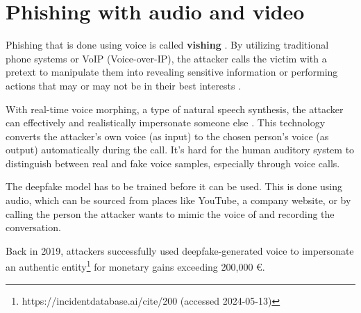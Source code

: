 
\section{Phishing with audio and video}
\begin{comment}
Phishing & spear phishing

What to cover:
    - What is phishing (via email and ALSO other means)
    - Spear phishing a more targeted form of phishing
    - How ChatGPT can be used to improve scam messages
    - ChatGPT:n eettisten ohjeistusten ohittaminen on jo käsitelty kohdassa Chatbots

\end{comment}

Phishing that is done using voice is called \textbf{vishing} \citep{salahdineSocialEngineeringAttacks2019}. By utilizing traditional phone systems or VoIP (Voice-over-IP), the attacker calls the victim with a pretext to manipulate them into revealing sensitive information or performing actions that may or may not be in their best interests \citep{hadnagySocialEngineering2018}.



With real-time voice morphing, a type of natural speech synthesis, the attacker can effectively and realistically impersonate someone else \citep{doanBTSEAudioDeepfakeDetectiong2023}. This technology converts the attacker's own voice (as input) to the chosen person's voice (as output) automatically during the call. It's hard for the human auditory system to distinguish between real and fake voice samples, especially through voice calls.

The deepfake model has to be trained before it can be used. This is done using audio, which can be sourced from places like YouTube, a company website, or by calling the person the attacker wants to mimic the voice of and recording the conversation.


Back in 2019, attackers successfully used deepfake-generated voice to impersonate an authentic entity\footnote{https://incidentdatabase.ai/cite/200 (accessed 2024-05-13)} for monetary gains exceeding 200,000 €.












